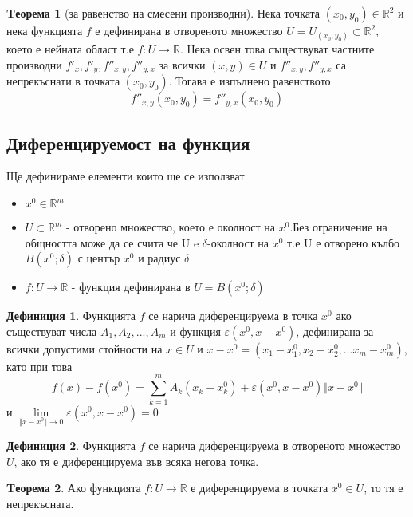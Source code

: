 \documentclass[a4paper,fleqn,12pt]{article}
\theoremstyle{definition}
\newtheorem{theorem}{Tеорема}[subsection]
\newtheorem{definition}{Дефиниция}[subsection]
\begin{document}
\begin{theorem}[за равенство на смесени производни]
Нека точката $(x_0, y_0) \in \mathbb{R}^2$ и нека функцията $f$ е дефинирана в отвореното множество $U=U_{(x_0, y_0)} \subset \mathbb{R}^2$, което е нейната област т.е $f: U \to \mathbb{R}$. Нека освен това съществуват частните производни $f'_x, f'_y,f''_{x,y},f''_{y,x}$ за всички $(x, y)\in U$ и $f''_{x,y},f''_{y,x}$ са непрекъснати в точката $(x_0, y_0)$. Тогава е изпълнено равенството 
$$f''_{x,y}(x_0, y_0) = f''_{y,x}(x_0, y_0)$$
\end{theorem}

\subsection{Диференцируемост на функция}
Ще дефинираме елементи които ще се използват. 
\begin{itemize}
	\item $x^0 \in \mathbb{R}^m$
	\item $U \subset \mathbb{R}^m$ - отворено множество, което е околност на $x^0$.Без ограничение на общността може да се счита че U e $\delta$-околност на $x^0$ т.е U е отворено кълбо $B(x^0;\delta)$ с център $x^0$ и радиус $\delta$
	\item $f: U \to \mathbb{R}$ - функция дефинирана в $U = B(x^0;\delta) $
\end{itemize}

\begin{definition}
Функцията $f$ се нарича диференцируема в точка $x^0$ ако съществуват числа $A_1, A_2, ..., A_m$ и функция $\varepsilon (x^0, x - x^0)$, дефинирана за всички допустими стойности на $x \in U$ и $x - x^0 = (x_1 - x_1 ^0, x_2 - x_2 ^0,... x_m - x_m ^0)$, като при това 
$$f(x) - f(x^0) = \sum_{k=1}^{m} A_k(x_k + x_k ^ 0) + \varepsilon (x^0, x - x^0) \Vert x - x^0 \Vert$$ 
и $\lim\limits_{\Vert x - x^0 \Vert \to 0}\varepsilon (x^0, x - x^0) = 0$
\end{definition}

\begin{definition}
Функцията $f$ се нарича диференцируема в отвореното множество $U$, ако тя е диференцируема във всяка негова точка. 
\end{definition}

\begin{theorem}
Ако функцията $f: U \to \mathbb{R}$ е диференцируема в точката $x^0 \in U$, то тя е непрекъсната. 
\end{theorem}
\end{document}
